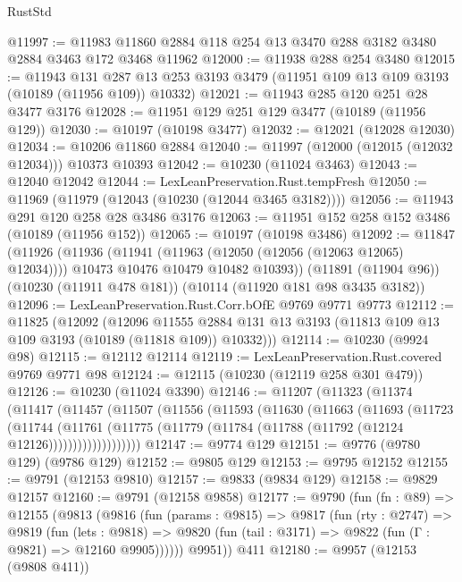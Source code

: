 \begin{lexlean}{RustStd}
\begin{coremodule}
@11997 := @11983 @11860 @2884 @118 @254 @13 @3470 @288 @3182 @3480 @2884 @3463 @172 @3468 @11962
@12000 := @11938 @288 @254 @3480
@12015 := @11943
    @131
    @287
    @13
    @253
    @3193
    @3479
    (@11951 @109 @13 @109 @3193 (@10189 (@11956 @109)) @10332)
@12021 := @11943 @285 @120 @251 @28 @3477 @3176
@12028 := @11951 @129 @251 @129 @3477 (@10189 (@11956 @129))
@12030 := @10197 (@10198 @3477)
@12032 := @12021 (@12028 @12030)
@12034 := @10206 @11860 @2884
@12040 := @11997 (@12000 (@12015 (@12032 @12034))) @10373 @10393
@12042 := @10230 (@11024 @3463)
@12043 := @12040 @12042
@12044 := LexLeanPreservation.Rust.tempFresh
@12050 := @11969 (@11979 (@12043 (@10230 (@12044 @3465 @3182))))
@12056 := @11943 @291 @120 @258 @28 @3486 @3176
@12063 := @11951 @152 @258 @152 @3486 (@10189 (@11956 @152))
@12065 := @10197 (@10198 @3486)
@12092 := @11847
    (@11926
      (@11936
        (@11941 (@11963 (@12050 (@12056 (@12063 @12065) @12034))))
        @10473
        @10476
        @10479
        @10482
        @10393))
    (@11891 (@11904 @96))
    (@10230 (@11911 @478 @181))
    (@10114 (@11920 @181 @98 @3435 @3182))
@12096 := LexLeanPreservation.Rust.Corr.bOfE @9769 @9771 @9773
@12112 := @11825
    (@12092
      (@12096
        @11555
        @2884
        @131
        @13
        @3193
        (@11813 @109 @13 @109 @3193 (@10189 (@11818 @109)) @10332)))
@12114 := @10230 (@9924 @98)
@12115 := @12112 @12114
@12119 := LexLeanPreservation.Rust.covered @9769 @9771 @98
@12124 := @12115 (@10230 (@12119 @258 @301 @479))
@12126 := @10230 (@11024 @3390)
@12146 := @11207
    (@11323
      (@11374
        (@11417
          (@11457
            (@11507
              (@11556
                (@11593
                  (@11630
                    (@11663
                      (@11693
                        (@11723
                          (@11744
                            (@11761
                              (@11775
                                (@11779 (@11784 (@11788 (@11792 (@12124 @12126)))))))))))))))))))
@12147 := @9774 @129
@12151 := @9776 (@9780 @129) (@9786 @129)
@12152 := @9805 @129
@12153 := @9795 @12152
@12155 := @9791 (@12153 @9810)
@12157 := @9833 (@9834 @129)
@12158 := @9829 @12157
@12160 := @9791 (@12158 @9858)
@12177 := @9790
    (fun (fn : @89) =>
    @12155
      (@9813
        (@9816
          (fun (params : @9815) =>
          @9817
            (fun (rty : @2747) =>
            @9819
              (fun (lets : @9818) =>
              @9820 (fun (tail : @3171) => @9822 (fun (Γ : @9821) => @12160 @9905))))))
        @9951))
    @411
@12180 := @9957 (@12153 (@9808 @411))

\end{coremodule}
\end{lexlean}
